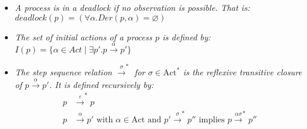 \begin{isabellebody}
\begin{isamarkuptext}
\begin{itemize}
    \item \textit{A process is in a \textnormal{deadlock} if no observation is possible. That is:
    $\mathit{deadlock} (p) = (\forall\alpha .\mathit{Der} (p, \alpha) = \varnothing)$}

    \item \textit{The set of \textnormal{initial actions} of a process $p$ is defined by: 
    $I(p)=\{\alpha \in Act \mid \exists p'. p \xrightarrow{\alpha} p'\}$}

    \item \textit{The \textnormal{step sequence relation} $\xrightarrow{\sigma}^*$ for $\sigma \in \text{Act}^*$ is the reflexive transitive closure of $p \xrightarrow{\alpha} p'$.
    It is defined recursively by:
    \begin{align*}
        p &\xrightarrow{\varepsilon}^* p \\
        p &\xrightarrow{\alpha} p' \text{ with } \alpha \in \text{Act} \text{ and } p' \xrightarrow{\sigma}^* p'' \text{ implies } p \xrightarrow{\alpha\sigma}^* p''
    \end{align*}}


\end{itemize}
\end{isamarkuptext}
\end{isabellebody}
